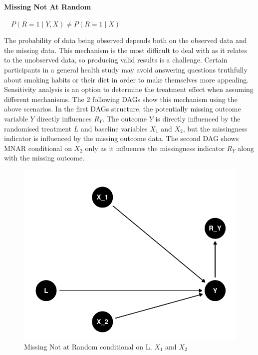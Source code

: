 \documentclass{article}
\begin{document}
\newpage

\textbf{Missing Not At Random}

\(\quad P(R = 1 \mid Y, X) \ne P(R = 1 \mid X)\)

The probability of data being observed depends both on the observed data
and the missing data. This mechanism is the most difficult to deal with
as it relates to the unobserved data, so producing valid results is a
challenge. Certain participants in a general health study may avoid
answering questions truthfully about smoking habits or their diet in
order to make themselves more appealing. Sensitivity analysis is an
option to determine the treatment effect when assuming different
mechanisms. The 2 following DAGs show this mechanism using the above
scenarios. In the first DAGs structure, the potentially missing outcome
variable \(Y\) directly influences \(R_Y\). The outcome \(Y\) is
directly influenced by the randomised treatment \(L\) and baseline
variables \(X_1\) and \(X_2\), but the missingness indicator is
influenced by the missing outcome data. The second DAG shows MNAR
conditional on \(X_2\) only as it influences the missingness indicator
\(R_Y\) along with the missing outcome.

\begin{figure}

{\centering \includegraphics{Final_Report_files/figure-latex/unnamed-chunk-4-1} 

}

\caption{Missing Not at Random conditional on L, \ensuremath{X_1} and \ensuremath{X_2}}\label{fig:unnamed-chunk-4}
\end{figure}
\end{document}
